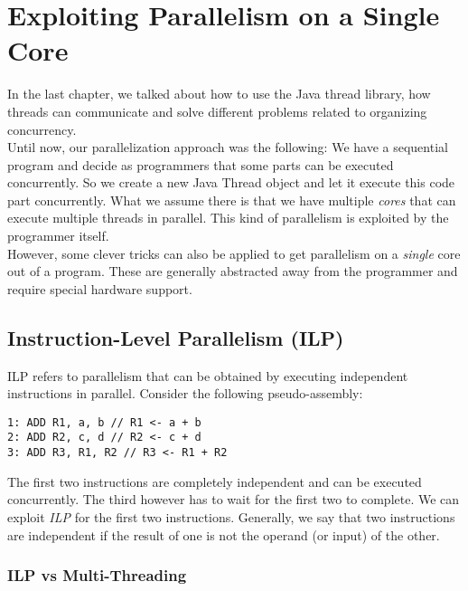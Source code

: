 \documentclass[main.tex]{subfiles}
\begin{document}
\addtolength{\tabcolsep}{-2pt}

\section{Exploiting Parallelism on a Single Core}
In the last chapter, we talked about how to use the Java thread library, how threads can communicate and solve different problems related to organizing concurrency.\\
Until now, our parallelization approach was the following: We have a sequential program and decide as programmers that some parts can be executed concurrently. So we create a new Java Thread object and let it execute this code part concurrently. What we assume there is that we have multiple \textit{cores} that can execute multiple threads in parallel. This kind of parallelism is exploited by the programmer itself.\\
However, some clever tricks can also be applied to get parallelism on a \textit{single} core out of a program. These are generally abstracted away from the programmer and require special hardware support.

\subsection{Instruction-Level Parallelism (ILP)}
ILP refers to parallelism that can be obtained by executing independent instructions in parallel. Consider the following pseudo-assembly:
\begin{verbatim}
1: ADD R1, a, b // R1 <- a + b
2: ADD R2, c, d // R2 <- c + d
3: ADD R3, R1, R2 // R3 <- R1 + R2
\end{verbatim}
The first two instructions are completely independent and can be executed concurrently. The third however has to wait for the first two to complete. We can exploit \textit{ILP} for the first two instructions. Generally, we say that two instructions are independent if the result of one is not the operand (or input) of the other.

\subsubsection{ILP vs Multi-Threading}
\end{document}
